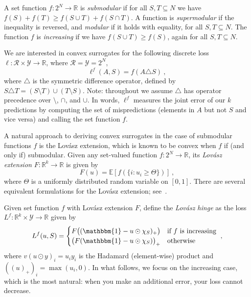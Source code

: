 \documentclass[12pt]{article}
\newcommand{\Comments}{1}
\newcommand{\mytodo}[2]{\ifnum\Comments=1%
  \todo[linecolor=#1!80!black,backgroundcolor=#1,bordercolor=#1!80!black]{#2}\fi}
\newcommand{\jessiet}[1]{\mytodo{teal!20!white}{JF: #1}}
\newcommand{\reals}{\mathbb{R}}
\newcommand{\E}{\mathbb{E}}
\newcommand{\R}{\mathcal{R}}
\newcommand{\Y}{\mathcal{Y}}
\newcommand{\ones}{\mathbbm{1}}
\begin{document}
A set function $f:2^N\to\reals$ is \emph{submodular} if for all $S,T\subseteq N$ we have $f(S) + f(T) \geq f(S\cup T) + f(S\cap T)$.
A function is \emph{supermodular} if the inequality is reversed, and \emph{modular} if it holds with equality, for all $S,T\subseteq N$.
The function $f$ is \emph{increasing} if we have $f(S\cup T) \geq f(S)$, again for all $S,T\subseteq N$.

We are interested in convex surrogates for the following discrete loss $\ell:\R\times\Y\to\reals$, where $\R=\Y=2^N$,
\begin{equation}
\label{eq:discrete-set-loss}
\ell^f(A,S) = f(A\triangle S)~,
\end{equation}
where $\triangle$ is the symmetric difference operator, defined by $S\triangle T = (S\setminus T) \cup (T\setminus S)$.
Note: throughout we assume $\triangle$ has operator precedence over $\setminus$, $\cap$, and $\cup$.
In words, $\ell^f$ measures the joint error of our $k$ predictions by computing the set of mispredictions (elements in $A$ but not $S$ and vice versa) and calling the set function $f$.

A natural approach to deriving convex surrogates in the case of submodular functions $f$ is the Lov\'asz extension, which is known to be convex when $f$ if (and only if) submodular. %
Given any set-valued function $f:2^N\to\reals$, its \emph{Lov\'asz extension} $F:\reals^k\to\reals$ is given by
\begin{equation}\label{eq:lovasz-ext}
F(u) = \E[f(\{i:u_i \geq \Theta\})]~,
\end{equation}
where $\Theta$ is a uniformly distributed random variable on $[0,1]$.
There are several equivalent formulations for the Lov\'asz extension; see~\citet[Definition 3.1]{bach2013learning}.

Given set function $f$ with Lov\'asz extension $F$, \citet{yu2018lovasz} define the \emph{Lov\'asz hinge} as the loss $L^f:\reals^k\times\Y\to\reals$ given by
\begin{equation}
\label{eq:lovasz-hinge}
L^f(u,S) =
\begin{cases}
F\bigl((\ones - u \odot \chi_S)_+\bigr) & \text{if $f$ is increasing}
\\
\bigl(F(\ones - u \odot \chi_S)\bigr)_+ & \text{otherwise}
\end{cases}~,
\end{equation}
where $v (u \odot y)_i = u_iy_i$ is the Hadamard (element-wise) product and $((u)_+)_i = \max(u_i,0)$.
In what follows, we focus on the increasing case, which is the most natural: when you make an additional error, your loss cannot decrease.
\end{document}
